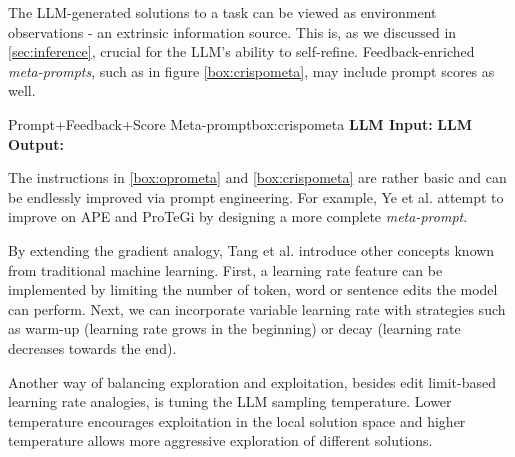 The LLM-generated solutions to a task can be viewed as environment observations - an extrinsic information source.
This is, as we discussed in \ref{sec:inference}, crucial for the LLM's ability to self-refine. 
Feedback-enriched \textit{meta-prompts}, such as in figure \ref{box:crispometa}, may include prompt scores as well.

\begin{figurebox}{Prompt+Feedback+Score Meta-prompt}{box:crispometa}
    \textbf{LLM Input:} 
    \textbf{LLM Output:} 
\end{figurebox}

The instructions in \ref{box:oprometa} and \ref{box:crispometa} are rather basic and can be endlessly
improved via prompt engineering. For example, Ye et al.\cite{ye2024promptengineeringpromptengineer} attempt to 
improve on APE and ProTeGi by designing a more complete \textit{meta-prompt}. 

By extending the gradient analogy, Tang et al.\cite{tang2024unleashingpotentiallargelanguage} introduce other concepts
known from traditional machine learning. First, a learning rate feature can be implemented by limiting the number of token, word or sentence edits the model
can perform. Next, we can incorporate variable learning rate with strategies such as warm-up (learning rate grows in the beginning) or decay (learning rate
decreases towards the end).

Another way of balancing exploration and exploitation, besides edit limit-based learning rate analogies, is tuning the LLM sampling temperature. 
Lower temperature encourages exploitation in the local solution space and higher temperature allows 
more aggressive exploration of different solutions\cite{yang2024largelanguagemodelsoptimizers}.

